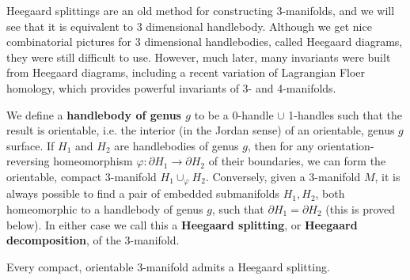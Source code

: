Heegaard splittings are an old method for constructing 3-manifolds, and we will see that it is equivalent to 3 dimensional handlebody. Although we get nice combinatorial pictures for 3 dimensional handlebodies, called Heegaard diagrams, they were still difficult to use. However, much later, many invariants were built from Heegaard diagrams, including a recent variation of Lagrangian Floer homology, which provides powerful invariants of 3- and 4-manifolds. 

We define a \textbf{handlebody of genus $g$} to be a 0-handle $\cup$ 1-handles such that the result is orientable, i.e. the interior (in the Jordan sense) of an orientable, genus $g$ surface. If $H_1$ and $H_2$ are handlebodies of genus $g$, then for any orientation-reversing homeomorphism $\varphi : \partial H_1 \rightarrow \partial H_2$ of their boundaries, we can form the orientable, compact 3-manifold $H_1 \cup_\varphi H_2$. Conversely, given a 3-manifold $M$, it is always possible to find a pair of embedded submanifolds $H_1,H_2$, both homeomorphic to a handlebody of genus $g$, such that $\partial H_1 = \partial H_2$ (this is proved below). In either case we call this a \textbf{Heegaard splitting}, or \textbf{Heegaard decomposition}, of the 3-manifold.
\begin{thm}
\label{existence of heegaard splitting}
Every compact, orientable 3-manifold admits a Heegaard splitting.
\end{thm}
